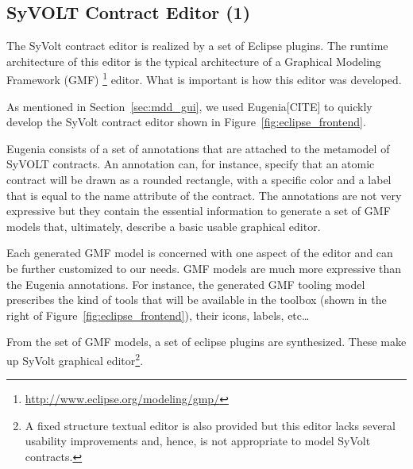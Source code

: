 
% 


\subsection{SyVOLT Contract Editor (1)}

The SyVolt contract editor is realized by a set of Eclipse plugins.
The runtime architecture of this editor is the typical architecture of a
Graphical Modeling Framework (GMF)
\footnote{\url{http://www.eclipse.org/modeling/gmp/}} editor.
What is important is how this editor was developed.

As mentioned in Section~\ref{sec:mdd_gui}, we used Eugenia[CITE] to quickly
develop the SyVolt contract editor shown in Figure~\ref{fig:eclipse_frontend}.

Eugenia consists of a set of annotations that are attached to the metamodel of
SyVOLT contracts. An annotation can, for instance, specify that an atomic
contract will be drawn as a rounded rectangle, with a specific color and a label
that is equal to the name attribute of the contract.
The annotations are not very expressive but they contain the essential
information to generate a set of GMF models that, ultimately, describe a basic
usable graphical editor.

Each generated GMF model is concerned with one aspect of the editor and can be
further customized to our needs. GMF models are much more expressive than the
Eugenia annotations.
For instance, the generated GMF tooling model prescribes the kind of tools that
will be available in the toolbox (shown in the right of
Figure~\ref{fig:eclipse_frontend}), their icons, labels, etc\ldots

From the set of GMF models, a set of eclipse plugins are synthesized.
These make up SyVolt graphical editor\footnote{A fixed structure textual editor
is also provided but this editor lacks several usability improvements and,
hence, is not appropriate to model SyVolt contracts.}.

